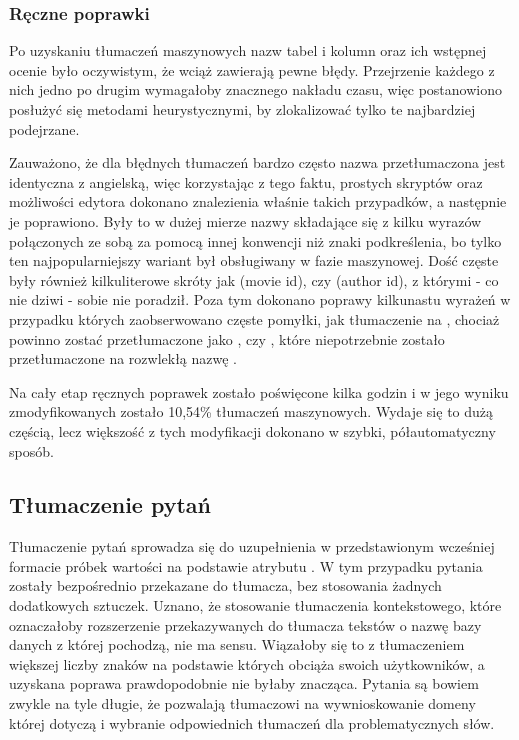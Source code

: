 \subsubsection{Ręczne poprawki}
Po uzyskaniu tłumaczeń maszynowych nazw tabel i kolumn oraz ich wstępnej ocenie było oczywistym, że wciąż zawierają pewne błędy. Przejrzenie każdego z nich jedno po drugim wymagałoby znacznego nakładu czasu, więc postanowiono posłużyć się metodami heurystycznymi, by zlokalizować tylko te najbardziej podejrzane. 

Zauważono, że dla błędnych tłumaczeń bardzo często nazwa przetłumaczona jest identyczna z angielską, więc korzystając z tego faktu, prostych skryptów oraz możliwości edytora  dokonano znalezienia właśnie takich przypadków, a następnie je poprawiono. Były to w dużej mierze nazwy składające się z kilku wyrazów połączonych ze sobą za pomocą innej konwencji niż znaki podkreślenia, bo tylko ten najpopularniejszy wariant był obsługiwany w fazie maszynowej. Dość częste były również kilkuliterowe skróty jak  (movie id), czy  (author id), z którymi - co nie dziwi -  sobie nie poradził. Poza tym dokonano poprawy kilkunastu wyrażeń w przypadku których zaobserwowano częste pomyłki, jak tłumaczenie  na , chociaż powinno zostać przetłumaczone jako , czy , które niepotrzebnie zostało przetłumaczone na rozwlekłą nazwę .

Na cały etap ręcznych poprawek zostało poświęcone kilka godzin i w jego wyniku zmodyfikowanych zostało 10,54\% tłumaczeń maszynowych. Wydaje się to dużą częścią, lecz większość z tych modyfikacji dokonano w szybki, półautomatyczny sposób.


\subsection{Tłumaczenie pytań}
Tłumaczenie pytań sprowadza się do uzupełnienia w przedstawionym wcześniej formacie próbek wartości  na podstawie atrybutu . W tym przypadku pytania zostały bezpośrednio przekazane do tłumacza, bez stosowania żadnych dodatkowych sztuczek. Uznano, że stosowanie tłumaczenia kontekstowego, które oznaczałoby rozszerzenie przekazywanych do tłumacza tekstów o nazwę bazy danych z której pochodzą, nie ma sensu. Wiązałoby się to z tłumaczeniem większej liczby znaków na podstawie których  obciąża swoich użytkowników, a uzyskana poprawa prawdopodobnie nie byłaby znacząca. Pytania są bowiem zwykle na tyle długie, że pozwalają tłumaczowi na wywnioskowanie domeny której dotyczą i wybranie odpowiednich tłumaczeń dla problematycznych słów. 

